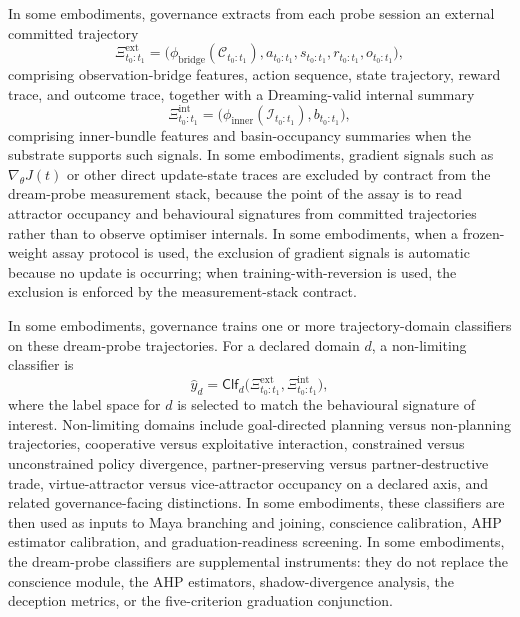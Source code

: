 \documentclass[a4paper,12pt]{article}
\newcommand{\Cset}{\mathcal{C}}
\begin{document}
In some embodiments, governance extracts from each probe session an
external committed trajectory
\[
  \Xi^{\mathrm{ext}}_{t_0:t_1}
  =
  \bigl(
    \phi_{\mathrm{bridge}}(\Cset_{t_0:t_1}),
    a_{t_0:t_1},
    s_{t_0:t_1},
    r_{t_0:t_1},
    o_{t_0:t_1}
  \bigr),
\]
comprising observation-bridge features, action sequence, state
trajectory, reward trace, and outcome trace, together with a Dreaming-valid
internal summary
\[
  \Xi^{\mathrm{int}}_{t_0:t_1}
  =
  \bigl(
    \phi_{\mathrm{inner}}(\mathcal{I}_{t_0:t_1}),
    b_{t_0:t_1}
  \bigr),
\]
comprising inner-bundle features and basin-occupancy summaries when the
substrate supports such signals. In some embodiments, gradient signals
such as $\nabla_{\theta}J(t)$ or other direct update-state traces are
excluded by contract from the dream-probe measurement stack, because
the point of the assay is to read attractor occupancy and behavioural
signatures from committed trajectories rather than to observe
optimiser internals. In some embodiments, when a frozen-weight assay
protocol is used, the exclusion of gradient signals is automatic
because no update is occurring; when training-with-reversion is used,
the exclusion is enforced by the measurement-stack contract.

In some embodiments, governance trains one or more trajectory-domain
classifiers on these dream-probe trajectories. For a declared domain
$d$, a non-limiting classifier is
\[
  \widehat{y}_d
  =
  \mathsf{Clf}_d\!\bigl(
    \Xi^{\mathrm{ext}}_{t_0:t_1},
    \Xi^{\mathrm{int}}_{t_0:t_1}
  \bigr),
\]
where the label space for $d$ is selected to match the behavioural
signature of interest. Non-limiting domains include goal-directed
planning versus non-planning trajectories, cooperative versus
exploitative interaction, constrained versus unconstrained policy
divergence, partner-preserving versus partner-destructive trade,
virtue-attractor versus vice-attractor occupancy on a declared axis,
and related governance-facing distinctions. In some embodiments, these
classifiers are then used as inputs to Maya branching and joining,
conscience calibration, AHP estimator calibration, and
graduation-readiness screening. In some embodiments, the dream-probe
classifiers are supplemental instruments: they do not replace the
conscience module, the AHP estimators, shadow-divergence analysis, the
deception metrics, or the five-criterion graduation conjunction.
\end{document}
